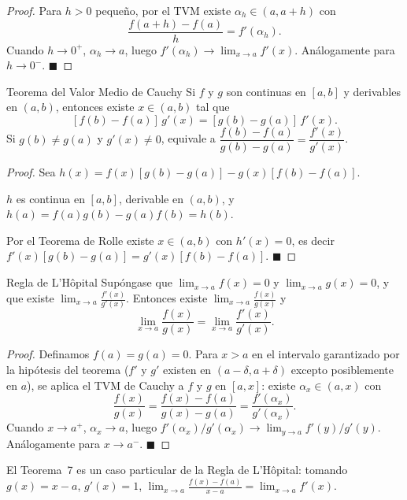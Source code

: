 \documentclass[12pt]{article}
\begin{document}
\begin{proof}
Para $h > 0$ pequeño, por el TVM existe $\alpha_h \in (a, a+h)$ con
\[ \frac{f(a+h)-f(a)}{h} = f'(\alpha_h). \]
Cuando $h \to 0^+$, $\alpha_h \to a$, luego $f'(\alpha_h) \to \displaystyle\lim_{x\to a}f'(x)$. Análogamente para $h \to 0^-$.
$\blacksquare$
\end{proof}

\begin{teorema}[8]{Teorema del Valor Medio de Cauchy}
Si $f$ y $g$ son continuas en $[a, b]$ y derivables en $(a, b)$, entonces existe $x \in (a, b)$ tal que
\[ [f(b) - f(a)]\,g'(x) = [g(b) - g(a)]\,f'(x). \]
Si $g(b) \neq g(a)$ y $g'(x) \neq 0$, equivale a $\dfrac{f(b)-f(a)}{g(b)-g(a)} = \dfrac{f'(x)}{g'(x)}$.
\end{teorema}

\begin{proof}
Sea $h(x) = f(x)[g(b)-g(a)] - g(x)[f(b)-f(a)]$.

$h$ es continua en $[a,b]$, derivable en $(a,b)$, y $h(a) = f(a)g(b)-g(a)f(b) = h(b)$.

Por el Teorema de Rolle existe $x \in (a,b)$ con $h'(x)=0$, es decir $f'(x)[g(b)-g(a)] = g'(x)[f(b)-f(a)]$.
$\blacksquare$
\end{proof}

\begin{teorema}[9]{Regla de L'Hôpital}
Supóngase que $\displaystyle\lim_{x \to a} f(x) = 0$ y $\displaystyle\lim_{x \to a} g(x) = 0$, y que existe $\displaystyle\lim_{x \to a} \frac{f'(x)}{g'(x)}$. Entonces existe $\displaystyle\lim_{x \to a} \frac{f(x)}{g(x)}$ y
\[ \lim_{x \to a} \frac{f(x)}{g(x)} = \lim_{x \to a} \frac{f'(x)}{g'(x)}. \]
\end{teorema}

\begin{proof}
Definamos $f(a) = g(a) = 0$. Para $x > a$ en el intervalo garantizado por la hipótesis del teorema ($f'$ y $g'$ existen en $(a-\delta,a+\delta)$ excepto posiblemente en $a$), se aplica el TVM de Cauchy a $f$ y $g$ en $[a, x]$: existe $\alpha_x \in (a, x)$ con
\[ \frac{f(x)}{g(x)} = \frac{f(x)-f(a)}{g(x)-g(a)} = \frac{f'(\alpha_x)}{g'(\alpha_x)}. \]
Cuando $x \to a^+$, $\alpha_x \to a$, luego $f'(\alpha_x)/g'(\alpha_x) \to \lim_{y\to a}f'(y)/g'(y)$.
Análogamente para $x \to a^-$.
$\blacksquare$
\end{proof}

\begin{nota}[]{}
El Teorema~7 es un caso particular de la Regla de L'Hôpital: tomando $g(x) = x - a$, $g'(x)=1$,
$\displaystyle\lim_{x\to a}\frac{f(x)-f(a)}{x-a} = \lim_{x\to a}f'(x)$.
\end{nota}
\end{document}
